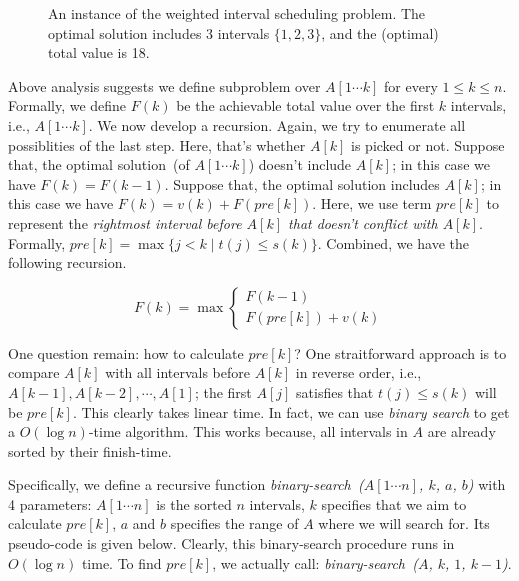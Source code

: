 \begin{figure}[h]
\centering{}
\caption{An instance of the weighted interval scheduling problem.
The optimal solution includes 3 intervals $\{1, 2, 3\}$,
and the (optimal) total value is 18.}
\label{fig:order}
\end{figure}


Above analysis suggests we define subproblem over $A[1\cdots k]$ for every $1\le k \le n$.
Formally, we define $F(k)$ be the achievable total value over the first $k$ intervals, i.e., $A[1\cdots k]$.
We now develop a recursion. Again, we try to enumerate all possiblities of the last step.
Here, that's whether $A[k]$ is picked or not. Suppose that, the optimal solution~(of $A[1\cdots k]$)
doesn't include $A[k]$; in this case we have $F(k) = F(k-1)$.
Suppose that, the optimal solution includes $A[k]$; in this case we have $F(k) = v(k) + F(pre[k])$.
Here, we use term $pre[k]$ to represent the \emph{rightmost interval before $A[k]$ that doesn't conflict with $A[k]$}.
Formally, $pre[k] = \max\{j < k \mid t(j) \le s(k)\}$.
Combined, we have the following recursion.

\begin{displaymath}
F(k) = \max\left\{
	\begin{array}{lll}
		F(k-1) \\
		F(pre[k]) + v(k)
	\end{array}
\right.
\end{displaymath}

One question remain: how to calculate $pre[k]$? One straitforward approach is to 
compare $A[k]$ with all intervals before $A[k]$ in reverse order, i.e., $A[k-1], A[k-2], \cdots, A[1]$;
the first $A[j]$ satisfies that $t(j) \le s(k)$ will be $pre[k]$. 
This clearly takes linear time. In fact, we can use \emph{binary search} to get a $O(\log n)$-time algorithm.
This works because, all intervals in $A$ are already sorted by their finish-time.

Specifically, we define a recursive function \emph{binary-search~($A[1\cdots n]$, $k$, $a$, $b$)}
with 4 parameters: $A[1\cdots n]$ is the sorted $n$ intervals, $k$ specifies that we aim to calculate $pre[k]$,
$a$ and $b$ specifies the range of $A$ where we will search for. 
Its pseudo-code is given below.
Clearly, this binary-search procedure runs in $O(\log n)$ time.
To find $pre[k]$, we actually call: \emph{binary-search~($A$, $k$, $1$, $k-1$)}.

